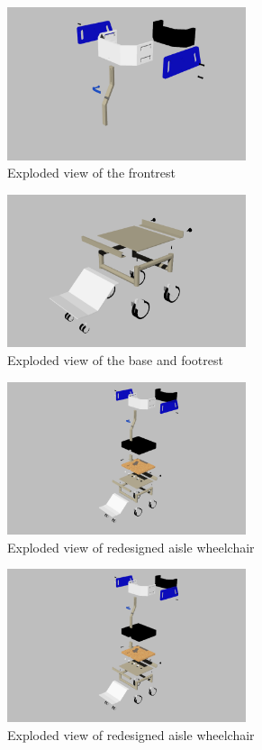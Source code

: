 \begin{figure}[h]
\centering
\includegraphics[width=7cm]{images/vistaex2.png}
\caption{Exploded view of the frontrest}
\label{fig:vistaex2}
\end{figure}

\begin{figure}[h]
\centering
\includegraphics[width=7cm]{images/vistaex3.png}
\caption{Exploded view of the base and footrest}
\label{fig:vistaex3}
\end{figure}

\begin{figure}[h]
\centering
\includegraphics[width=7cm]{images/vistaex4.png}
\caption{Exploded view of  redesigned aisle wheelchair}
\label{fig:vistaex4}
\end{figure}

\begin{figure}[h]
\centering
\includegraphics[width=7cm]{images/vistaex4.png}
\caption{Exploded view of  redesigned aisle wheelchair}
\label{fig:vistaex4}
\end{figure}

